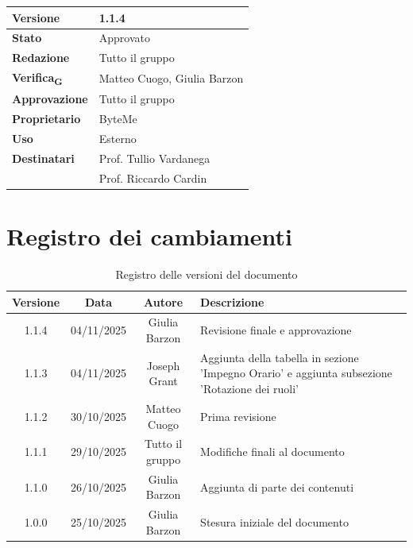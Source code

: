 \documentclass[11pt,a4paper]{article}
\newcommand{\gls}[1]{#1\textsubscript{G}}
\begin{document}
\begin{titlepage}
    \begin{table}[H]
        \centering
        \begin{tabular}{|l|p{5cm}|}            
            \hline
            \textbf{Versione} & 1.1.4 \\
            \hline
            \textbf{Stato} & Approvato \\
            \hline
            \textbf{Redazione} & Tutto il gruppo \\
            \hline
            \textbf{\gls{Verifica}} & Matteo Cuogo, Giulia Barzon \\
            \hline
            \textbf{Approvazione} & Tutto il gruppo \\
            \hline
            \textbf{Proprietario} & ByteMe \\
            \hline
            \textbf{Uso} & Esterno \\
            \hline
            \textbf{Destinatari} & Prof. Tullio Vardanega \\ & Prof. Riccardo Cardin \\
            \hline
        \end{tabular}
    \end{table}
    
    \vfill
\end{titlepage}

\section*{Registro dei cambiamenti}

\begin{table}[H]
    \centering
    \begin{tabular}{|c|c|c|>{\raggedright\arraybackslash}p{}|}
        \hline
        \textbf{Versione} & \textbf{Data} & \textbf{Autore} & \textbf{Descrizione} \\
        \hline
        1.1.4 & 04/11/2025 & Giulia Barzon & Revisione finale e approvazione\\
        \hline
        1.1.3 & 04/11/2025 & Joseph Grant & Aggiunta della tabella in sezione 'Impegno Orario' e aggiunta subsezione 'Rotazione dei ruoli'  \\
        \hline
        1.1.2 & 30/10/2025 & Matteo Cuogo & Prima revisione \\
        \hline
        1.1.1 & 29/10/2025 & Tutto il gruppo & Modifiche finali al documento \\
        \hline
        1.1.0 & 26/10/2025 & Giulia Barzon & Aggiunta di parte dei contenuti \\
        \hline
        1.0.0 & 25/10/2025 & Giulia Barzon & Stesura iniziale del documento \\
        \hline
    \end{tabular}
    \caption{Registro delle versioni del documento}
    \label{tab:versionamento}
\end{table}
\end{document}
